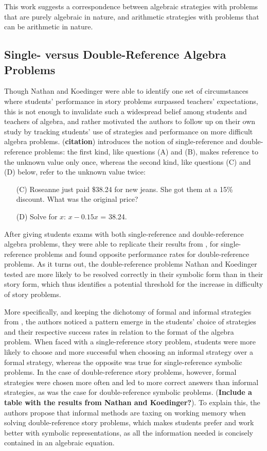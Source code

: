 \documentclass[10pt,letterpaper]{article}
\begin{document}
This work suggests a correspondence between algebraic strategies with problems that are purely algebraic in nature, and arithmetic strategies with problems that can be arithmetic in nature.

\subsection{Single- versus Double-Reference Algebra Problems}

Though Nathan and Koedinger were able to identify one set of circumstances where students' performance in story problems surpassed teachers' expectations, this is not enough to invalidate such a widespread belief among students and teachers of algebra, and rather motivated the authors to follow up on their own study by tracking students' use of strategies and performance on more difficult algebra problems. (\textbf{citation}) introduces the notion of single-reference and double-reference problems: the first kind, like questions (A) and (B), makes reference to the unknown value only once, whereas the second kind, like questions (C) and (D) below, refer to the unknown value twice:

\begin{enumerate}
	\item[(C)] Roseanne just paid \$38.24 for new jeans. She got them at a 15\% discount. What was the original price?
	
	\item[(D)] Solve for $x$: $x - 0.15x$ = 38.24.
\end{enumerate}

After giving students exams with both single-reference and double-reference algebra problems, they were able to replicate their results from , for single-reference problems and found opposite performance rates for double-reference problems. As it turns out, the double-reference problems Nathan and Koedinger tested are more likely to be resolved correctly in their symbolic form than in their story form, which thus identifies a potential threshold for the increase in difficulty of story problems. 

More specifically, and keeping the dichotomy of formal and informal strategies from , the authors noticed a pattern emerge in the students' choice of strategies and their respective success rates in relation to the format of the algebra problem. When faced with a single-reference story problem, students were more likely to choose and more successful when choosing an informal strategy over a formal strategy, whereas the opposite was true for single-reference symbolic problems. In the case of double-reference story problems, however, formal strategies were chosen more often and led to more correct answers than informal strategies, as was the case for double-reference symbolic problems. (\textbf{Include a table with the results from Nathan and Koedinger?}). To explain this, the authors propose that informal methods are taxing on working memory when solving double-reference story problems, which makes students prefer and work better with symbolic representations, as all the information needed is concisely contained in an algebraic equation.
\end{document}
